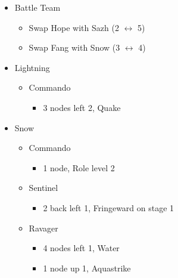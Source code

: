 \renewcommand{\sixth}{[6] Cerberus (\com/\com/\com)}
\begin{multicols}{2}
\begin{menu}
\begin{itemize}
    \paradigm
    \begin{itemize}
        \item Battle Team
        \begin{itemize}
            \item Swap Hope with Sazh (2 $\leftrightarrow$ 5)
            \item Swap Fang with Snow (3 $\leftrightarrow$ 4)
        \end{itemize}
{\paradigmline[1]{\textit{\com}}{\textit{\syn}}{\textit{(\com)}}}%
{\paradigmline{(\rav)}{\rav}{\rav}}%
{\paradigmline{(\com)}{\syn}{\sen}}%
{\paradigmline{[\rav]}{(\rav)}{(\rav)}}%
{\paradigmline{\com}{[\com]}{\com}}%
{\paradigmline{\com}{[\com]}{\com}}
    \end{itemize}
    \crystarium
    \begin{itemize}
        \item Lightning
        \begin{itemize}
            \item Commando
            \begin{itemize}
                \item 3 nodes left 2, Quake
            \end{itemize}
        \end{itemize}
        \item Snow
        \begin{itemize}
            \item Commando
            \begin{itemize}
                \item 1 node, Role level 2
            \end{itemize}
            \item Sentinel
            \begin{itemize}
                \item 2 back left 1, Fringeward on stage 1
            \end{itemize}
            \item Ravager
            \begin{itemize}
                \item 4 nodes left 1, Water
                \item 1 node up 1, Aquastrike

\end{itemize}
\end{itemize}
\end{itemize}
\end{itemize}
\end{menu}
\end{multicols}
